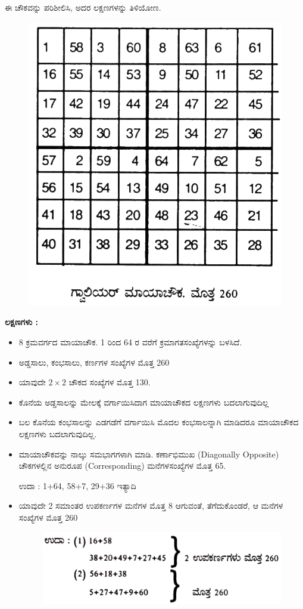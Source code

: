 ಈ ಚೌಕವನ್ನು ಪರಿಶೀಲಿಸಿ, ಅದರ ಲಕ್ಷಣಗಳನ್ನು ತಿಳಿಯೋಣ.
\begin{figure}[H]
\includegraphics[scale=.78]{src/figures/chap4/fig4.21.jpg}
\end{figure}

\textbf{ಲಕ್ಷಣಗಳು :}

\begin{itemize}
	\item 8 ಕ್ರಮವರ್ಗದ ಮಾಯಾಚೌಕ. 1 ರಿಂದ 64 ರ ವರೆಗೆ ಕ್ರಮಾಗತಸಂಖ್ಯೆಗಳನ್ನು ಬಳಸಿದೆ.\-
	\item ಅಡ್ಡಸಾಲು, ಕಂಭಸಾಲು, ಕರ್ಣಗಳ ಸಂಖ್ಯೆಗಳ ಮೊತ್ತ 260
	\item ಯಾವುದೇ $2 \times 2$ ಚೌಕದ ಸಂಖ್ಯೆಗಳ ಮೊತ್ತ 130.
	\item ಕೊನೆಯ ಅಡ್ಡಸಾಲನ್ನು ಮೇಲಕ್ಕೆ ವರ್ಗಾಯಿಸಿದಾಗ ಮಾಯಾಚೌಕದ ಲಕ್ಷಣಗಳು ಬದಲಾಗುವುದಿಲ್ಲ
	\item ಬಲ ಕೊನೆಯ ಕಂಭಸಾಲನ್ನು ಎಡಗಡೆಗೆ ವರ್ಗಾಯಿಸಿ ಮೊದಲ ಕಂಭಸಾಲನ್ನಾಗಿ ಮಾಡಿದರೂ ಮಾಯಾಚೌಕದ ಲಕ್ಷಣಗಳು ಬದಲಾಗುವುದಿಲ್ಲ.
	\item ಮಾಯಾಚೌಕವನ್ನು ನಾಲ್ಕು ಸಮಭಾಗಗಳಾಗಿ ಮಾಡಿ. ಕರ್ಣಾಭಿಮುಖ (Diago\-nally Opposite) ಚೌಕಗಳಲ್ಲಿನ ಅನುರೂಪ (Corresponding) ಮನೆಗಳ\break ಸಂಖ್ಯೆಗಳ ಮೊತ್ತ 65.

	ಉದಾ : 1+64, 58+7, 29+36 ಇತ್ಯಾದಿ
	\item ಯಾವುದೇ 2 ಸಮಾಂತರ ಉಪಕರ್ಣಗಳ ಮನೆಗಳ ಮೊತ್ತ 8 ಆಗುವಂತೆ, ತೆಗೆದುಕೊಂಡರೆ, ಆ ಮನೆಗಳ ಸಂಖ್ಯೆಗಳ ಮೊತ್ತ 260
	\begin{figure}[H]
	\includegraphics[scale=.9]{src/figures/chap4/fig4.22.jpg}
	\end{figure}
\end{itemize}


